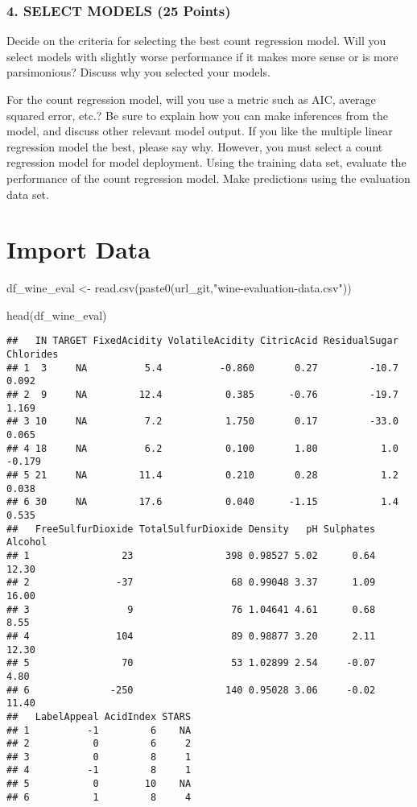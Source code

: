 \documentclass[
]{article}
\newenvironment{Shaded}{\begin{snugshade}}{\end{snugshade}}
\newcommand{\FunctionTok}[1]{\textcolor[rgb]{0.00,0.00,0.00}{#1}}
\newcommand{\NormalTok}[1]{#1}
\newcommand{\OtherTok}[1]{\textcolor[rgb]{0.56,0.35,0.01}{#1}}
\newcommand{\StringTok}[1]{\textcolor[rgb]{0.31,0.60,0.02}{#1}}
\begin{document}
\hypertarget{select-models-25-points}{%
\subsubsection{4. SELECT MODELS (25
Points)}\label{select-models-25-points}}

Decide on the criteria for selecting the best count regression model.
Will you select models with slightly worse performance if it makes more
sense or is more parsimonious? Discuss why you selected your models.

For the count regression model, will you use a metric such as AIC,
average squared error, etc.? Be sure to explain how you can make
inferences from the model, and discuss other relevant model output. If
you like the multiple linear regression model the best, please say why.
However, you must select a count regression model for model deployment.
Using the training data set, evaluate the performance of the count
regression model. Make predictions using the evaluation data set.

\hypertarget{import-data}{%
\section{Import Data}\label{import-data}}

\begin{Shaded}
\begin{Highlighting}[]
\NormalTok{df\_wine\_eval }\OtherTok{\textless{}{-}} 
  \FunctionTok{read.csv}\NormalTok{(}\FunctionTok{paste0}\NormalTok{(url\_git,}\StringTok{"wine{-}evaluation{-}data.csv"}\NormalTok{))}

\FunctionTok{head}\NormalTok{(df\_wine\_eval)}
\end{Highlighting}
\end{Shaded}

\begin{verbatim}
##   IN TARGET FixedAcidity VolatileAcidity CitricAcid ResidualSugar Chlorides
## 1  3     NA          5.4          -0.860       0.27         -10.7     0.092
## 2  9     NA         12.4           0.385      -0.76         -19.7     1.169
## 3 10     NA          7.2           1.750       0.17         -33.0     0.065
## 4 18     NA          6.2           0.100       1.80           1.0    -0.179
## 5 21     NA         11.4           0.210       0.28           1.2     0.038
## 6 30     NA         17.6           0.040      -1.15           1.4     0.535
##   FreeSulfurDioxide TotalSulfurDioxide Density   pH Sulphates Alcohol
## 1                23                398 0.98527 5.02      0.64   12.30
## 2               -37                 68 0.99048 3.37      1.09   16.00
## 3                 9                 76 1.04641 4.61      0.68    8.55
## 4               104                 89 0.98877 3.20      2.11   12.30
## 5                70                 53 1.02899 2.54     -0.07    4.80
## 6              -250                140 0.95028 3.06     -0.02   11.40
##   LabelAppeal AcidIndex STARS
## 1          -1         6    NA
## 2           0         6     2
## 3           0         8     1
## 4          -1         8     1
## 5           0        10    NA
## 6           1         8     4
\end{verbatim}
\end{document}
